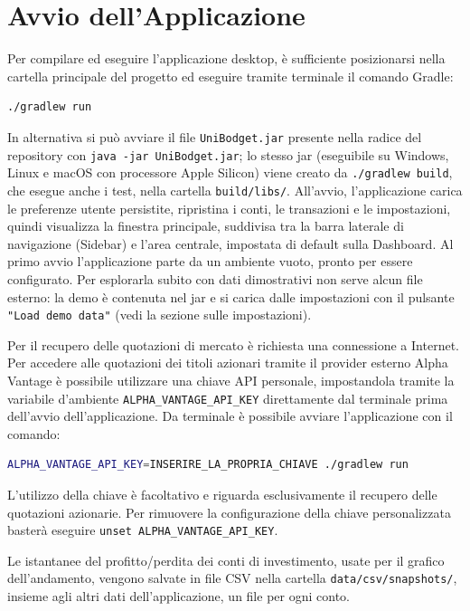 \documentclass[11pt,a4paper,openright]{report}
\begin{document}
\section*{Avvio dell'Applicazione}
Per compilare ed eseguire l'applicazione desktop, è sufficiente posizionarsi nella cartella principale del progetto ed eseguire tramite terminale il comando Gradle:
\begin{lstlisting}[language=bash]
./gradlew run
\end{lstlisting}
In alternativa si può avviare il file \texttt{UniBodget.jar} presente nella radice del repository con \texttt{java -jar UniBodget.jar}; lo stesso jar (eseguibile su Windows, Linux e macOS con processore Apple Silicon) viene creato da \texttt{./gradlew build}, che esegue anche i test, nella cartella \texttt{build/libs/}. All'avvio, l'applicazione carica le preferenze utente persistite, ripristina i conti, le transazioni e le impostazioni, quindi visualizza la finestra principale, suddivisa tra la barra laterale di navigazione (Sidebar) e l'area centrale, impostata di default sulla Dashboard. Al primo avvio l'applicazione parte da un ambiente vuoto, pronto per essere configurato. Per esplorarla subito con dati dimostrativi non serve alcun file esterno: la demo è contenuta nel jar e si carica dalle impostazioni con il pulsante \texttt{"Load demo data"} (vedi la sezione sulle impostazioni).

Per il recupero delle quotazioni di mercato è richiesta una connessione a Internet. Per accedere alle quotazioni dei titoli azionari tramite il provider esterno Alpha Vantage è possibile utilizzare una chiave API personale, impostandola tramite la variabile d'ambiente \texttt{ALPHA\_VANTAGE\_API\_KEY} direttamente dal terminale prima dell'avvio dell'applicazione. Da terminale è possibile avviare l'applicazione con il comando:
\begin{lstlisting}[language=bash]
ALPHA_VANTAGE_API_KEY=INSERIRE_LA_PROPRIA_CHIAVE ./gradlew run
\end{lstlisting}
L'utilizzo della chiave è facoltativo e riguarda esclusivamente il recupero delle quotazioni azionarie. Per rimuovere la configurazione della chiave personalizzata basterà eseguire \texttt{unset ALPHA\_VANTAGE\_API\_KEY}.

Le istantanee del profitto/perdita dei conti di investimento, usate per il grafico dell'andamento, vengono salvate in file CSV nella cartella \texttt{data/csv/snapshots/}, insieme agli altri dati dell'applicazione, un file per ogni conto.
\end{document}
